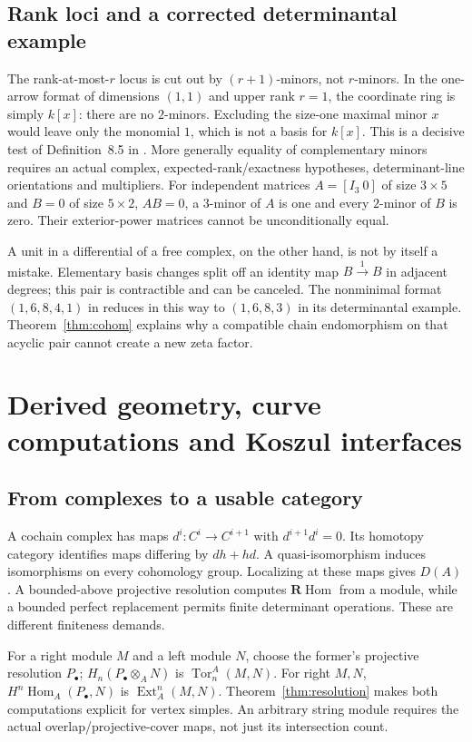 \subsection{Rank loci and a corrected determinantal example}
The rank-at-most-$r$ locus is cut out by $(r+1)$-minors, not $r$-minors. In the one-arrow format of dimensions $(1,1)$ and upper rank $r=1$, the coordinate ring is simply $k[x]$: there are no $2$-minors. Excluding the size-one maximal minor $x$ would leave only the monomial $1$, which is not a basis for $k[x]$. This is a decisive test of Definition~8.5 in \cite{S3}. More generally equality of complementary minors requires an actual complex, expected-rank/exactness hypotheses, determinant-line orientations and multipliers. For independent matrices $A=[I_3\ 0]$ of size $3\times5$ and $B=0$ of size $5\times2$, $AB=0$, a $3$-minor of $A$ is one and every $2$-minor of $B$ is zero. Their exterior-power matrices cannot be unconditionally equal.

A unit in a differential of a free complex, on the other hand, is not by itself a mistake. Elementary basis changes split off an identity map $B\xrightarrow{1}B$ in adjacent degrees; this pair is contractible and can be canceled. The nonminimal format $(1,6,8,4,1)$ in \cite{S3} reduces in this way to $(1,6,8,3)$ in its determinantal example. Theorem~\ref{thm:cohom} explains why a compatible chain endomorphism on that acyclic pair cannot create a new zeta factor.

\section{Derived geometry, curve computations and Koszul interfaces}
\subsection{From complexes to a usable category}
A cochain complex has maps $d^i:C^i\to C^{i+1}$ with $d^{i+1}d^i=0$. Its homotopy category identifies maps differing by $dh+hd$. A quasi-isomorphism induces isomorphisms on every cohomology group. Localizing at these maps gives $D(A)$. A bounded-above projective resolution computes $\mathbf R\operatorname{Hom}$ from a module, while a bounded perfect replacement permits finite determinant operations. These are different finiteness demands.

For a right module $M$ and a left module $N$, choose the former's projective resolution $P_\bullet$; $H_n(P_\bullet\otimes_A N)$ is $\operatorname{Tor}^A_n(M,N)$. For right $M,N$, $H^n\operatorname{Hom}_A(P_\bullet,N)$ is $\operatorname{Ext}^n_A(M,N)$. Theorem~\ref{thm:resolution} makes both computations explicit for vertex simples. An arbitrary string module requires the actual overlap/projective-cover maps, not just its intersection count.

